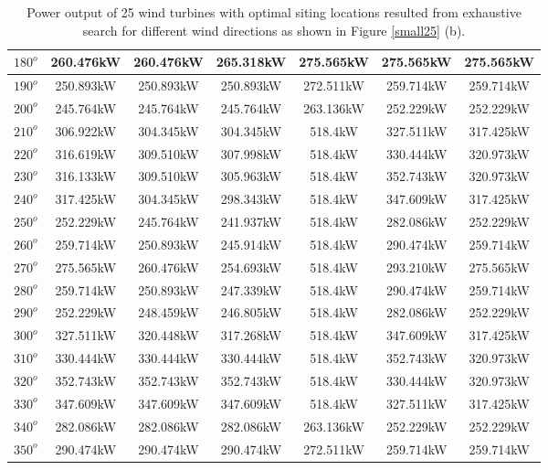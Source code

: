 \begin{table}[H]
\begin{tabular}{|c|c|c|c|c|c|c|}
		$180^o$	& 260.476kW	& 260.476kW	& 265.318kW	& 275.565kW	& 275.565kW	& 275.565kW	\\ \hline
		$190^o$	& 250.893kW	& 250.893kW	& 250.893kW	& 272.511kW	& 259.714kW	& 259.714kW	\\ \hline
		$200^o$	& 245.764kW	& 245.764kW	& 245.764kW	& 263.136kW	& 252.229kW	& 252.229kW	\\ \hline
		$210^o$	& 306.922kW	& 304.345kW	& 304.345kW	& 518.4kW	& 327.511kW	& 317.425kW	\\ \hline
		$220^o$	& 316.619kW	& 309.510kW	& 307.998kW	& 518.4kW	& 330.444kW	& 320.973kW	\\ \hline
		$230^o$	& 316.133kW	& 309.510kW	& 305.963kW	& 518.4kW	& 352.743kW	& 320.973kW	\\ \hline
		$240^o$	& 317.425kW	& 304.345kW	& 298.343kW	& 518.4kW	& 347.609kW	& 317.425kW	\\ \hline
		$250^o$	& 252.229kW	& 245.764kW	& 241.937kW	& 518.4kW	& 282.086kW	& 252.229kW	\\ \hline
		$260^o$	& 259.714kW	& 250.893kW	& 245.914kW	& 518.4kW	& 290.474kW	& 259.714kW	\\ \hline
		$270^o$	& 275.565kW	& 260.476kW	& 254.693kW	& 518.4kW	& 293.210kW	& 275.565kW	\\ \hline
		$280^o$	& 259.714kW	& 250.893kW	& 247.339kW	& 518.4kW	& 290.474kW	& 259.714kW	\\ \hline
		$290^o$	& 252.229kW	& 248.459kW	& 246.805kW	& 518.4kW	& 282.086kW	& 252.229kW	\\ \hline
		$300^o$	& 327.511kW	& 320.448kW	& 317.268kW	& 518.4kW	& 347.609kW	& 317.425kW	\\ \hline
		$310^o$	& 330.444kW	& 330.444kW	& 330.444kW	& 518.4kW	& 352.743kW	& 320.973kW	\\ \hline
		$320^o$	& 352.743kW	& 352.743kW	& 352.743kW	& 518.4kW	& 330.444kW	& 320.973kW	\\ \hline
		$330^o$	& 347.609kW	& 347.609kW	& 347.609kW	& 518.4kW	& 327.511kW	& 317.425kW	\\ \hline
		$340^o$	& 282.086kW	& 282.086kW	& 282.086kW	& 263.136kW	& 252.229kW	& 252.229kW	\\ \hline
		$350^o$	& 290.474kW	& 290.474kW	& 290.474kW	& 272.511kW	& 259.714kW	& 259.714kW	\\ \hline
        	\end{tabular}
        	\caption{Power output of 25 wind turbines with optimal siting locations resulted from exhaustive search for different wind directions as shown in Figure \ref{small25} (b).}
        	\label{table25b}
        \end{table}
